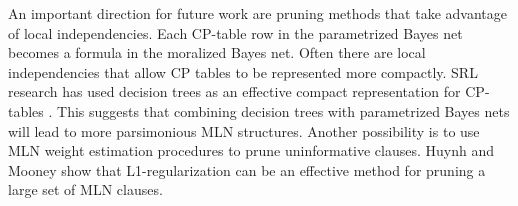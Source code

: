 \documentclass[letterpaper]{article}
\begin{document}
An important direction for future work are pruning methods that take advantage of local independencies.
%
%
Each CP-table row in the parametrized Bayes net becomes a formula in the moralized Bayes net. Often there are local independencies that  allow CP tables to be represented more compactly. SRL research has used decision trees as an effective compact representation for CP-tables \cite{Getoor2001}. This suggests that combining decision trees with parametrized Bayes nets will lead to more parsimonious MLN structures. Another possibility is to use MLN weight estimation procedures to prune uninformative clauses. 
Huynh and Mooney  show that L1-regularization can be an effective method for pruning a large set of MLN clauses.

\end{document}
